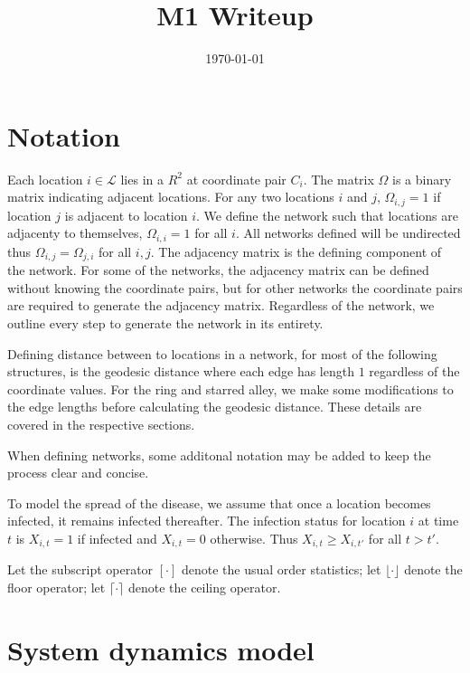 \documentclass[11pt]{article}
\date{\today}
\title{M1 Writeup}
\begin{document}
\maketitle
\tableofcontents


\section{Notation}
\label{sec-1}

Each location $i \in \mathcal{L}$ lies in a $R^2$ at coordinate pair
$C_i$.  The matrix $\Omega$ is a binary matrix indicating adjacent
locations.  For any two locations $i$ and $j$, $\Omega_{i,j} = 1$ if
location $j$ is adjacent to location $i$.  We define the network such
that locations are adjacenty to themselves, $\Omega_{i,i} = 1$ for all
$i$.  All networks defined will be undirected thus $\Omega_{i,j} =
  \Omega_{j,i}$ for all $i,j$.  The adjacency matrix is the defining
component of the network.  For some of the networks, the adjacency
matrix can be defined without knowing the coordinate pairs, but for
other networks the coordinate pairs are required to generate the
adjacency matrix.  Regardless of the network, we outline every step to
generate the network in its entirety.

Defining distance between to locations in a network, for most of the
following structures, is the geodesic distance where each edge has
length $1$ regardless of the coordinate values.  For the ring and
starred alley, we make some modifications to the edge lengths before
calculating the geodesic distance.  These details are covered in the
respective sections.

When defining networks, some additonal notation may be added to keep
the process clear and concise.

To model the spread of the disease, we assume that once a location
becomes infected, it remains infected thereafter.  The infection
status for location $i$ at time $t$ is $X_{i,t} = 1$ if infected and
$X_{i,t} = 0$ otherwise.  Thus $X_{i,t} \ge X_{i,t'}$ for all $t > t'$.

Let the subscript operator $[\cdot]$ denote the usual order
statistics; let $\lfloor \cdot \rfloor$ denote the floor operator; let
$\lceil \cdot \rceil$ denote the ceiling operator.


\section{System dynamics model}
\label{sec-2}
\end{document}
